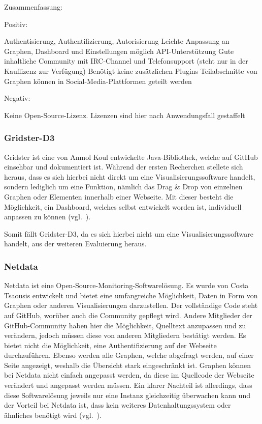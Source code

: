 Zusammenfassung:

Positiv:

\begin{outline}
  \1 Authentisierung, Authentifizierung, Autorisierung
  \1 Leichte Anpassung an Graphen, \gls{Dashboard} und Einstellungen möglich
  \1 \gls{API}\hyp{}Unterstützung
  \1 Gute inhaltliche Community mit IRC\hyp{}Channel und Telefonsupport (steht
  nur in der Kauflizenz zur Verfügung)
  \1 Benötigt keine zusätzlichen Plugins
  \1 Teilabschnitte von Graphen können in Social\hyp{}Media\hyp{}Plattformen
  geteilt werden
\end{outline}

Negativ:

\begin{outline}
  \1 Keine Open\hyp{}Source\hyp{}Lizenz. Lizenzen sind hier nach Anwendungsfall
  gestaffelt
\end{outline}
\mr%

\subsubsection{Gridster-D3}
\label{subsubsec:gridster-d3}
Gridster ist eine von Anmol Koul entwickelte Java\hyp{}Bibliothek, welche auf
\gls{GitHub} einsehbar und dokumentiert ist. Während der ersten Recherchen
stellete sich heraus, dass es sich hierbei nicht direkt um eine
Visualisierungssoftware handelt, sondern lediglich um eine Funktion, nämlich
das Drag \& Drop von einzelnen Graphen oder Elementen innerhalb einer Webseite.
Mit dieser besteht die Möglichkeit, ein \gls{Dashboard}, welches selbst
entwickelt worden ist, individuell anpassen zu können
(vgl.~\cite{gridster-d3}).

Somit fällt Gridster\hyp{}D3, da es sich hierbei nicht um eine
Visualisierungssoftware handelt, aus der weiteren Evaluierung heraus.
\mr%

\subsubsection{Netdata}
\label{subsubsec:netdata}
Netdata ist eine Open\hyp{}Source\hyp{}Monitoring\hyp{}Softwarelösung. Es wurde
von Costa Tsaousis entwickelt und bietet eine umfangreiche Möglichkeit, Daten
in Form von Graphen oder anderen Visualisierungen darzustellen. Der
vollständige Code steht auf \gls{GitHub}, worüber auch die Community gepflegt
wird. Andere Mitglieder der \gls{GitHub}\hyp{}Community haben hier die
Möglichkeit, Quelltext anzupassen und zu verändern, jedoch müssen diese von
anderen Mitgliedern bestätigt werden. Es bietet nicht die Möglichkeit, eine
Authentifizierung auf der Webseite durchzuführen. Ebenso werden alle Graphen,
welche abgefragt werden, auf einer Seite angezeigt, weshalb die Übersicht stark
eingeschränkt ist. Graphen können bei Netdata nicht einfach angepasst werden,
da diese im Quellcode der Webseite verändert und angepasst werden müssen. Ein
klarer Nachteil ist allerdings, dass diese Softwarelösung jeweils nur eine
Instanz gleichzeitig überwachen kann und der Vorteil bei Netdata ist, dass kein
weiteres Datenhaltungssystem oder ähnliches benötigt wird
(vgl.~\cite{netdata}).

